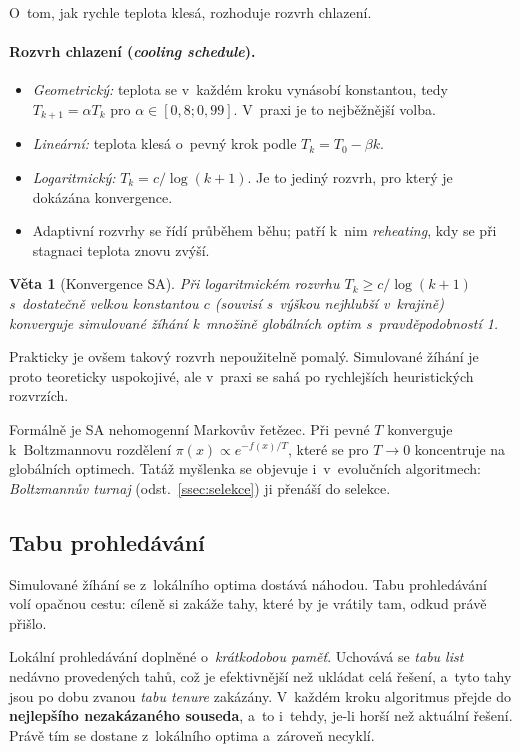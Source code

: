 \documentclass[11pt,a4paper]{article}
\newtheorem{veta}{Věta}[section]
\theoremstyle{definition}
\begin{document}
O~tom, jak rychle teplota klesá, rozhoduje rozvrh chlazení.

\paragraph{Rozvrh chlazení (\emph{cooling schedule}).}
\begin{itemize}
\item \emph{Geometrický:} teplota se v~každém kroku vynásobí konstantou, tedy
  $T_{k+1} = \alpha T_k$ pro $\alpha \in [0{,}8; 0{,}99]$. V~praxi je to nejběžnější volba.
\item \emph{Lineární:} teplota klesá o~pevný krok podle $T_k = T_0 - \beta k$.
\item \emph{Logaritmický:} $T_k = c/\log(k+1)$. Je to jediný rozvrh, pro který je
  dokázána konvergence.
\item Adaptivní rozvrhy se řídí průběhem běhu; patří k~nim \emph{reheating}, kdy se při
  stagnaci teplota znovu zvýší.
\end{itemize}

\begin{veta}[Konvergence SA]
Při logaritmickém rozvrhu $T_k \ge c/\log(k+1)$ s~dostatečně velkou konstantou
$c$ (souvisí s~výškou nejhlubší  v~krajině) konverguje simulované
žíhání k~množině globálních optim s~pravděpodobností 1.
\end{veta}
Prakticky je ovšem takový rozvrh nepoužitelně pomalý. Simulované žíhání je proto
teoreticky uspokojivé, ale v~praxi se sahá po rychlejších heuristických rozvrzích.

Formálně je SA nehomogenní Markovův řetězec. Při pevné $T$ konverguje k~Boltzmannovu
rozdělení $\pi(x) \propto e^{-f(x)/T}$, které se pro $T \to 0$ koncentruje na globálních
optimech. Tatáž myšlenka se objevuje i~v~evolučních algoritmech: \emph{Boltzmannův
turnaj} (odst.~\ref{ssec:selekce}) ji přenáší do selekce.

\subsection{Tabu prohledávání}

Simulované žíhání se z~lokálního optima dostává náhodou. Tabu prohledávání volí opačnou
cestu: cíleně si zakáže tahy, které by je vrátily tam, odkud právě přišlo.

\begin{defbox}
Lokální prohledávání doplněné o~\emph{krátkodobou paměť}. Uchovává se \emph{tabu list}
nedávno provedených tahů, což je efektivnější než ukládat celá řešení, a~tyto tahy jsou
po dobu zvanou \emph{tabu tenure} zakázány. V~každém kroku algoritmus přejde do
\textbf{nejlepšího nezakázaného souseda}, a~to i~tehdy, je-li horší než aktuální řešení.
Právě tím se dostane z~lokálního optima a~zároveň necyklí.
\end{defbox}
\end{document}
